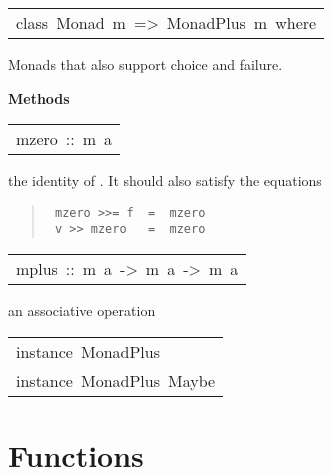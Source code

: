\begin{haddockdesc}
\item[\begin{tabular}{@{}l}
class\ Monad\ m\ =>\ MonadPlus\ m\ where
\end{tabular}]\haddockbegindoc
Monads that also support choice and failure.
\par

\haddockpremethods{}\textbf{Methods}
\begin{haddockdesc}
\item[\begin{tabular}{@{}l}
mzero\ ::\ m\ a
\end{tabular}]\haddockbegindoc
the identity of .  It should also satisfy the equations
\par
\begin{quote}
{\haddockverb\begin{verbatim}
 mzero >>= f  =  mzero
 v >> mzero   =  mzero
\end{verbatim}}
\end{quote}

\end{haddockdesc}
\begin{haddockdesc}
\item[\begin{tabular}{@{}l}
mplus\ ::\ m\ a\ ->\ m\ a\ ->\ m\ a
\end{tabular}]\haddockbegindoc
an associative operation
\par

\end{haddockdesc}
\end{haddockdesc}
\begin{haddockdesc}
\item[\begin{tabular}{@{}l}
instance\ MonadPlus\ {\char 91}{\char 93}\\instance\ MonadPlus\ Maybe
\end{tabular}]
\end{haddockdesc}
\section{Functions
}
